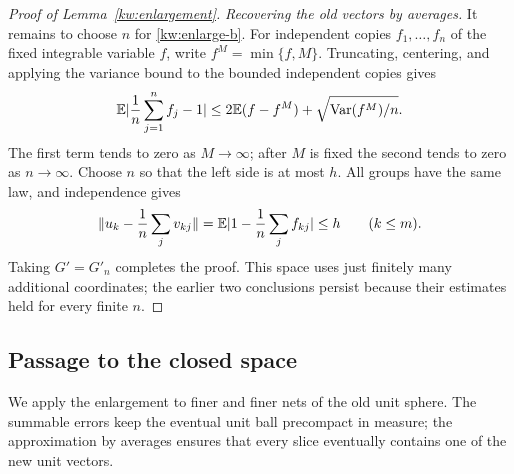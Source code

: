\begin{proof}[Proof of Lemma~\ref{kw:enlargement}]
\emph{Recovering the old vectors by averages.}
It remains to choose $n$ for \eqref{kw:enlarge-b}.
For independent copies $f_1,\dots,f_n$ of the fixed integrable variable
$f$, write $f^M=\min\{f,M\}$.  Truncating, centering, and applying the
variance bound to the bounded independent copies gives
\begin{equation}\label{kw:lln}
 \mathbb E\lvert\frac1n\sum_{j=1}^nf_j-1\rvert
 \le2\mathbb E(f-f^M)+\sqrt{\operatorname{Var}(f^M)/n}.
\end{equation}
The first term tends to zero as $M\to\infty$; after $M$ is fixed the
second tends to zero as $n\to\infty$.  Choose $n$ so that the left side
is at most $h$.  All groups have the same law, and independence gives
\[
 \lVert u_k-\frac1n\sum_jv_{kj}\rVert
 =\mathbb E\lvert1-\frac1n\sum_jf_{kj}\rvert\le h
 \qquad(k\le m).
\]
Taking $G'=G'_n$ completes the proof.  This space uses just finitely many
additional coordinates; the earlier two conclusions persist because
their estimates held for every finite $n$.
\end{proof}

\subsection{Passage to the closed space}

We apply the enlargement to finer and finer nets of the old unit sphere.
The summable errors keep the eventual unit ball precompact in measure;
the approximation by averages ensures that every slice eventually
contains one of the new unit vectors.

